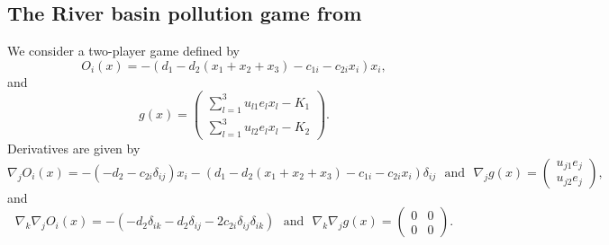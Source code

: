 \documentclass[11pt, a4paper]{article}
\newcommand{\txtm}[1]{\textrm{~~#1~~}}
\begin{document}
\subsection{The River basin pollution game from \cite{krawuryasev00}}
We consider a two-player game defined by 
$$
O_i(x) = - (d_1 - d_2 (x_1+x_2+x_3) - c_{1i} - c_{2i} x_i)x_i,
$$
and
$$
g(x) = 
\left( \begin{matrix}
\sum\limits_{l=1}^3 u_{l1} e_l x_l - K_1 \\
\sum\limits_{l=1}^3 u_{l2} e_l x_l - K_2 
\end{matrix} \right).
$$
Derivatives are given by
$$
\nabla_j O_i(x) = - ( - d_2  - c_{2i} \delta_{ij})x_i - (d_1 - d_2 (x_1+x_2+x_3) - c_{1i} - c_{2i} x_i)\delta_{ij}
\txtm{and}
\nabla_j g(x) = 
\left( \begin{matrix}
u_{j1} e_j  \\
u_{j2} e_j
\end{matrix} \right),
$$
and
$$
\nabla_k \nabla_j O_i(x) = -( - d_2\delta_{ik} - d_2\delta_{ij}  - 2 c_{2i} \delta_{ij}\delta_{ik})
\txtm{and}
\nabla_k \nabla_j g(x) = 
\left( \begin{matrix}
0 & 0  \\
0 & 0
\end{matrix} \right).
$$




\newpage




\appendix
\end{document}
